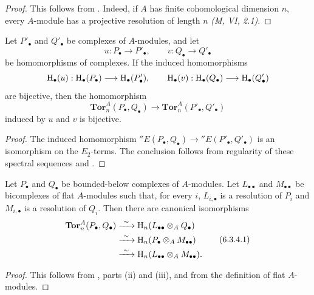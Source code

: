 \begin{proof}
This follows from .  Indeed, if $A$ has finite
cohomological dimension $n$, every $A$-module has a projective
resolution of length $n$ \emph{(M, VI, 2.1)}.
\end{proof}

\begin{corollary}[6.3.3]
\label{III.6.3.3}
Let $P'_\bullet$ and $Q'_\bullet$ be complexes of $A$-modules, and
let
\[
  u:P_\bullet\to P'_\bullet,
  \qquad
  v:Q_\bullet\to Q'_\bullet
\]
be homomorphisms of complexes.  If the induced homomorphisms
\[
  \mathrm{H}_\bullet(u):
  \mathrm{H}_\bullet(P_\bullet)\longrightarrow\mathrm{H}_\bullet(P'_\bullet),
  \qquad
  \mathrm{H}_\bullet(v):
  \mathrm{H}_\bullet(Q_\bullet)\longrightarrow\mathrm{H}_\bullet(Q'_\bullet)
\]
are bijective, then the homomorphism
\[
  \mathbf{Tor}_n^A(P_\bullet,Q_\bullet)
  \longrightarrow
  \mathbf{Tor}_n^A(P'_\bullet,Q'_\bullet)
\]
induced by $u$ and $v$ is bijective.
\end{corollary}

\begin{proof}
The induced homomorphism $''E(P_\bullet,Q_\bullet)
\longrightarrow
''E(P'_\bullet,Q'_\bullet)$
is an isomorphism on the $E_2$-terms.  The conclusion follows from
regularity of these spectral sequences  and
.
\end{proof}

\begin{proposition}[6.3.4]
\label{III.6.3.4}
Let $P_\bullet$ and $Q_\bullet$ be bounded-below complexes of
$A$-modules.  Let $L_{\bullet\bullet}$ and
$M_{\bullet\bullet}$ be bicomplexes of flat $A$-modules such that,
for every $i$, $L_{i,\bullet}$ is a resolution of $P_i$ and
$M_{i,\bullet}$ is a resolution of $Q_i$.  Then there are canonical
isomorphisms
\[
  \begin{split}
  \mathbf{Tor}_n^A(P_\bullet,Q_\bullet)
  &\xrightarrow{\ \sim\ }
  \mathrm{H}_n(L_{\bullet\bullet}\otimes_AQ_\bullet)\\
  &\xrightarrow{\ \sim\ }
  \mathrm{H}_n(P_\bullet\otimes_AM_{\bullet\bullet})\\
  &\xrightarrow{\ \sim\ }
  \mathrm{H}_n(L_{\bullet\bullet}\otimes_AM_{\bullet\bullet}).
  \end{split}
  \tag{6.3.4.1}\label{III.6.3.4.1}
\]
\end{proposition}

\begin{proof}
This follows from , parts (ii) and (iii), and
from the definition of flat $A$-modules.
\end{proof}

